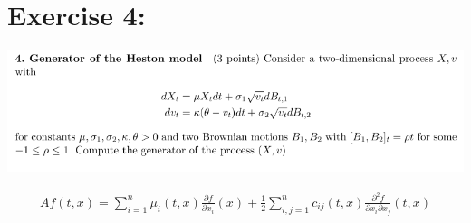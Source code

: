 \documentclass[document.tex]{subfiles}
\begin{document}
\section*{Exercise 4:}


\includegraphics[width=\textwidth]{ex4.png}


\begin{align*}
Af(t,x)=\sum_{i=1}^{n} \mu_i(t,x) \frac{\partial f}{\partial x_i} (x) + \frac{1}{2} \sum_{i,j=1}^n c_{ij} (t,x) 
\frac{\partial^2 f}{\partial x_i \partial x_j} (t,x)
\end{align*}
\end{document}
